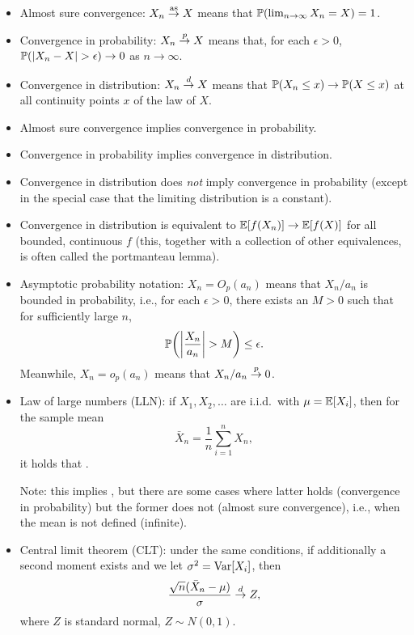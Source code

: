 \documentclass{article}
\begin{document}
\begin{itemize}
\item Almost sure convergence: $X_n \asto X$ means that 
  $\P(\lim_{n\to \infty} X_n = X ) = 1$.   

\item Convergence in probability: $X_n \pto X$ means that, for each
  $\epsilon>0$, $\P(|X_n - X| > \epsilon) \to 0$ as $n \to \infty$.  

\item Convergence in distribution: $X_n \dto X$ means that $\P(X_n \leq x) \to 
  \P(X \leq x)$ at all continuity points $x$ of the law of $X$. 

\item Almost sure convergence implies convergence in probability. 

\item Convergence in probability implies convergence in distribution.

\item Convergence in distribution does \emph{not} imply convergence in
  probability (except in the special case that the limiting distribution is a
  constant).   

\item Convergence in distribution is equivalent to $\E[ f(X_n) ] \to \E[ f(X) ]$
  for all bounded, continuous $f$ (this, together with a collection of other
  equivalences, is often called the portmanteau lemma).  

\item Asymptotic probability notation: $X_n = O_p(a_n)$ means that $X_n/a_n$ is
  bounded in probability, i.e., for each $\epsilon>0$, there exists an $M>0$
  such that for sufficiently large $n$,
  \[
  \P\bigg( \bigg|\frac{X_n}{a_n}\bigg| > M \bigg) \leq \epsilon.
  \]
  Meanwhile, $X_n = o_p(a_n)$ means that $X_n/a_n \pto 0$. 

\item Law of large numbers (LLN): if $X_1,X_2,\dots$ are i.i.d.\ with $\mu =
  \E[X_i]$, then for the sample mean 
  \[
  \bar{X}_n = \frac{1}{n} \sum_{i=1}^n X_n,
  \]
  it holds that .

  Note: this implies , but there are some cases
  where latter holds (convergence in probability) but the former does not
  (almost sure convergence), i.e., when the mean is not defined (infinite). 

\item Central limit theorem (CLT): under the same conditions, if additionally a
  second moment exists and we let $\sigma^2 = \Var[X_i]$, then
  \[
  \frac{\sqrt{n}(\bar{X}_n - \mu)}{\sigma} \dto Z,
  \]
  where $Z$ is standard normal, $Z \sim N(0,1)$. 


\end{itemize}
\end{document}
